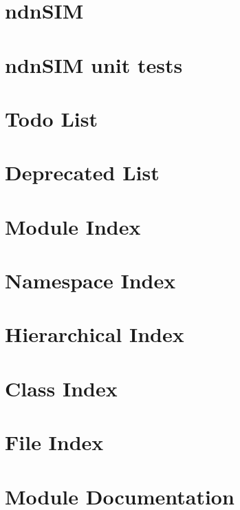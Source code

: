 \documentclass[twoside]{book}
\newcommand{\+}{\discretionary{\mbox{\scriptsize$\hookleftarrow$}}{}{}}
\begin{document}
\chapter{ndn\+S\+IM}
\label{md__home_network_NSOL_ndnSIM-dev_ns-3_src_ndnSIM_README}
\hypertarget{md__home_network_NSOL_ndnSIM-dev_ns-3_src_ndnSIM_README}{}

\chapter{ndn\+S\+IM unit tests}
\label{md__home_network_NSOL_ndnSIM-dev_ns-3_src_ndnSIM_tests_unit-tests_README}
\hypertarget{md__home_network_NSOL_ndnSIM-dev_ns-3_src_ndnSIM_tests_unit-tests_README}{}

\chapter{Todo List}
\label{todo}
\hypertarget{todo}{}

\chapter{Deprecated List}
\label{deprecated}
\hypertarget{deprecated}{}

\chapter{Module Index}

\chapter{Namespace Index}

\chapter{Hierarchical Index}

\chapter{Class Index}

\chapter{File Index}

\chapter{Module Documentation}






\end{document}
